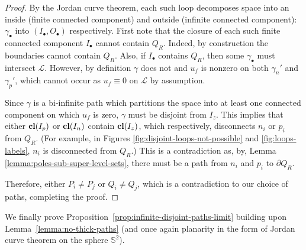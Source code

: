 \documentclass[12pt]{amsart}
\numberwithin{equation}{section}
\begin{document}
\begin{proof}
		By the Jordan curve theorem, each such loop decomposes space into an inside (finite connected component) and outside (infinite connected component): $\gamma_{\bullet}$ into $(I_{\bullet}, O_{\bullet})$ respectively. 
		First note that the closure of each such finite connected component $I_{\bullet}$ cannot contain $Q_R$. Indeed, by construction the boundaries cannot contain $Q_R$. Also, 
		if $I_{\bullet}$ contains $Q_R$, then some $\gamma_{\bullet}$ must intersect $\mathcal{L}$. However, by definition $\gamma$ does not and $u_f$ is nonzero 
		on both $\gamma_n'$ and $\gamma_p'$, which cannot occur as $u_f \equiv 0$ on $\mathcal{L}$ by assumption.
		
		Since $\gamma$ is a bi-infinite path which partitions the space into at least one connected component on which $u_f$ is zero, $\gamma$ must be disjoint from $I_z$. 
		This implies that either $\mathbf{cl}(I_p)$ or $\mathbf{cl}(I_n)$ contain $\mathbf{cl}(I_z)$, which respectively, disconnects $n_i$ or $p_i$ from $Q_R$. (For example, in Figures \ref{fig:disjoint-loops-not-possible} and \ref{fig:loops-labels}, $n_i$ is disconnected from $Q_R$.)  This is a contradiction as, by, Lemma \ref{lemma:poles-sub-super-level-sets}, there must be a path from $n_i$ and $p_i$ to $\partial Q_R$.
		
		Therefore, either $P_i \neq P_{j}$ or $Q_i \neq Q_{j}$, which is a contradiction to our choice of paths, completing the proof.  \end{proof}
	
	We finally prove Proposition~\ref{prop:infinite-disjoint-paths-limit} building upon Lemma~\ref{lemma:no-thick-paths} (and once again planarity in the form of Jordan curve theorem on the sphere $\mathbb{S}^2$).
	
\end{document}
